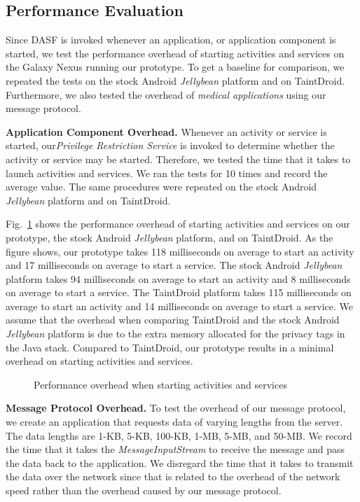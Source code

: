\subsection{Performance Evaluation}

Since DASF is invoked whenever an application, or application
component is started, we test the performance overhead of starting
activities and services on the Galaxy Nexus running our prototype.  To get
a baseline for comparison, we repeated the tests on the stock
Android \textit{Jellybean} platform and on TaintDroid.  Furthermore,
we also tested the overhead of \textit{medical applications} using our
message protocol. 

\textbf{Application Component Overhead.}  Whenever an activity or
service is started, our\textit{Privilege Restriction Service} is
invoked to determine whether the activity or service may be started.
Therefore, we tested the time that it takes to launch activities and
services.  We ran the tests for 10 times and record the average
value.  The same procedures were repeated on the stock
Android \textit{Jellybean} platform and on TaintDroid.  

Fig.~\ref{fig:component} shows the performance overhead of starting
activities and services on our prototype, the stock
Android \textit{Jellybean} platform, and on TaintDroid. As the figure
shows, our prototype takes 118 milliseconds on average to start an
activity and 17 milliseconds on average to start a service.  The stock
Android \textit{Jellybean} platform takes 94 milliseconds on average
to start an activity and 8 milliseconds on average to start a service.
The TaintDroid platform takes 115 milliseconds on average to start an
activity and 14 milliseconds on average to start a service.  We assume
that the overhead when comparing TaintDroid and the stock
Android \textit{Jellybean} platform is due to the extra memory
allocated for the privacy tags in the Java stack. 
Compared to TaintDroid, our prototype results in
a minimal overhead on starting activities and services. 

\begin{figure}[ht]
\centering
{}
\caption{Performance overhead when starting activities and services}
\label{fig:component}
\end{figure}

\textbf{Message Protocol Overhead.}  To test the overhead of our
message protocol, we create an application that requests data of
varying lengths from the server. The data lengths are 1-KB, 5-KB,
100-KB, 1-MB, 5-MB, and 50-MB. We record the time that it takes
the \textit{MessageInputStream} to receive the message and pass the
data back to the application.  We disregard the time that it takes to
transmit the data over the network since that is related 
to the overhead of the network speed rather than the overhead caused by
our message protocol.  

